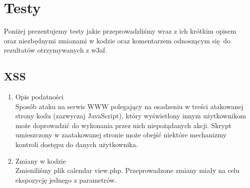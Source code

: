\chapter{Testy}
\label{cha:testy}

Poniżej prezentujemy testy jakie przeprowadzliśmy wraz z ich krótkim opisem oraz niezbędnymi zmianami w kodzie oraz komentarzem odnoszącym się do rezultatów otrzymywanych z w3af. 
\section{XSS}

\begin{enumerate}
\item Opis podatności\\
 Sposób ataku na serwis WWW polegający na osadzeniu w treści atakowanej strony kodu (zazwyczaj JavaScript), który wyświetlony innym użytkownikom może doprowadzić do wykonania przez nich niepożądanych akcji. Skrypt umieszczony w zaatakowanej stronie może obejść niektóre mechanizmy kontroli dostępu do danych użytkownika.

\item Zmiany w kodzie\\
Zmieniliśmy plik calendar view.php. Przeprowadzone zmiany miały na celu ekspozycję jednego z parametrów.

\noindent
\begin{minipage}{\linewidth}
\label{erd}
\end{minipage}
\end{enumerate}

